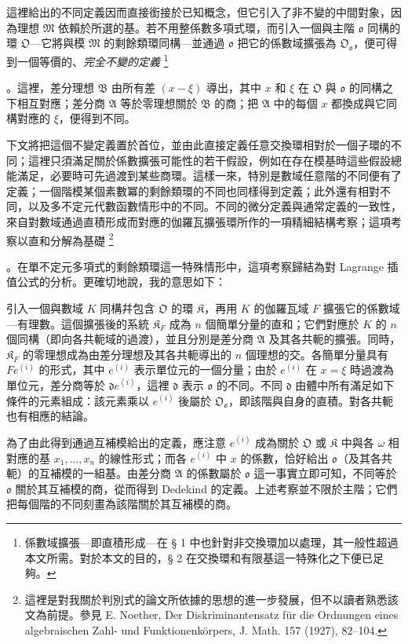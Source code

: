 \documentclass[11pt]{article}
\providecommand{\srcfn}[2]{%
  \begingroup
  \renewcommand{\thefootnote}{#1}%
  \footnote{#2}%
  \addtocounter{footnote}{-1}%
  \endgroup}
\begin{document}
這裡給出的不同定義因而直接銜接於已知概念，但它引入了非不變的中間對象，因為理想 \(\mathfrak M\) 依賴於所選的基。若不用整係數多項式環，而引入一個與主階 \(\mathfrak o\) 同構的環 \(\mathfrak O\)---它將與模 \(\mathfrak M\) 的剩餘類環同構---並通過 \(\mathfrak o\) 把它的係數域擴張為 \(\mathfrak O_{\mathfrak o}\)，便可得到一個等價的、\emph{完全不變的定義}\srcfn{2)}{係數域擴張---即直積形成---在 § 1 中也針對非交換環加以處理，其一般性超過本文所需。對於本文的目的，§ 2 在交換環和有限基這一特殊化之下便已足夠。}。這裡，差分理想 \(\mathfrak B\) 由所有差 \((x-\xi)\) 導出，其中 \(x\) 和 \(\xi\) 在 \(\mathfrak O\) 與 \(\mathfrak o\) 的同構之下相互對應；差分商 \(\mathfrak A\) 等於零理想關於 \(\mathfrak B\) 的商；把 \(\mathfrak A\) 中的每個 \(x\) 都換成與它同構對應的 \(\xi\)，便得到不同。

下文將把這個不變定義置於首位，並由此直接定義任意交換環相對於一個子環的不同；這裡只須滿足關於係數擴張可能性的若干假設，例如在存在模基時這些假設總能滿足，必要時可先過渡到某些商環。這樣一來，特別是數域任意階的不同便有了定義；一個階模某個素數冪的剩餘類環的不同也同樣得到定義；此外還有相對不同，以及多不定元代數函數情形中的不同。不同的微分定義與通常定義的一致性，來自對數域通過直積形成而對應的伽羅瓦擴張環所作的一項精細結構考察；這項考察以直和分解為基礎\srcfn{3)}{這裡是對我關於判別式的論文所依據的思想的進一步發展，但不以讀者熟悉該文為前提。參見 E. Noether, Der Diskriminantensatz für die Ordnungen eines algebraischen Zahl- und Funktionenkörpers, J. Math. 157 (1927), 82--104.}。在單不定元多項式的剩餘類環這一特殊情形中，這項考察歸結為對 Lagrange 插值公式的分析。更確切地說，我的意思如下：

引入一個與數域 \(K\) 同構幷包含 \(\mathfrak O\) 的環 \(\mathfrak K\)，再用 \(K\) 的伽羅瓦域 \(F\) 擴張它的係數域---有理數。這個擴張後的系統 \(\mathfrak K_F\) 成為 \(n\) 個簡單分量的直和；它們對應於 \(K\) 的 \(n\) 個同構（即向各共軛域的過渡），並且分別是差分商 \(\mathfrak A\) 及其各共軛的擴張。同時，\(\mathfrak K_F\) 的零理想成為由差分理想及其各共軛導出的 \(n\) 個理想的交。各簡單分量具有 \(Fe^{(i)}\) 的形式，其中 \(e^{(i)}\) 表示單位元的一個分量；由於 \(e^{(i)}\) 在 \(x=\xi\) 時過渡為單位元，差分商等於 \(\mathfrak d e^{(i)}\)，這裡 \(\mathfrak d\) 表示 \(\mathfrak o\) 的不同。不同 \(\mathfrak d\) 由體中所有滿足如下條件的元素組成：該元素乘以 \(e^{(i)}\) 後屬於 \(\mathfrak O_{\mathfrak o}\)，即該階與自身的直積。對各共軛也有相應的結論。

為了由此得到通過互補模給出的定義，應注意 \(e^{(i)}\) 成為關於 \(\mathfrak O\) 或 \(\mathfrak K\) 中與各 \(\omega\) 相對應的基 \(x_1,\ldots,x_n\) 的線性形式；而各 \(e^{(i)}\) 中 \(x\) 的係數，恰好給出 \(\mathfrak o\)（及其各共軛）的互補模的一組基。由差分商 \(\mathfrak A\) 的係數屬於 \(\mathfrak o\) 這一事實立即可知，不同等於 \(\mathfrak o\) 關於其互補模的商，從而得到 Dedekind 的定義。上述考察並不限於主階；它們把每個階的不同刻畫為該階關於其互補模的商。
\end{document}
